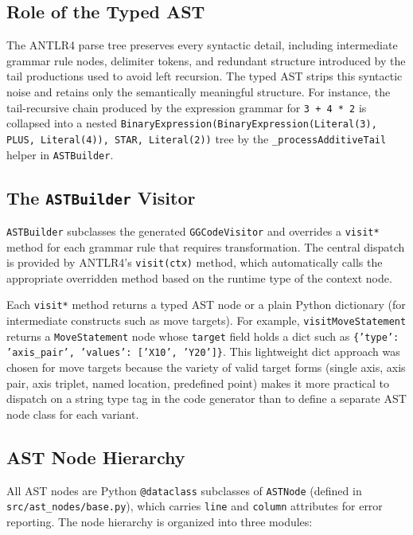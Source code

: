 \subsection*{Role of the Typed AST}

The ANTLR4 parse tree preserves every syntactic detail, including intermediate grammar rule nodes, delimiter tokens, and redundant structure introduced by the tail productions used to avoid left recursion. The typed AST strips this syntactic noise and retains only the semantically meaningful structure. For instance, the tail-recursive chain produced by the expression grammar for \texttt{3 + 4 * 2} is collapsed into a nested \texttt{BinaryExpression(BinaryExpression(Literal(3), PLUS, Literal(4)), STAR, Literal(2))} tree by the \texttt{\_processAdditiveTail} helper in \texttt{ASTBuilder}.

\subsection*{The \texttt{ASTBuilder} Visitor}

\texttt{ASTBuilder} subclasses the generated \texttt{GGCodeVisitor} and overrides a \texttt{visit*} method for each grammar rule that requires transformation. The central dispatch is provided by ANTLR4's \texttt{visit(ctx)} method, which automatically calls the appropriate overridden method based on the runtime type of the context node.

Each \texttt{visit*} method returns a typed AST node or a plain Python dictionary (for intermediate constructs such as move targets). For example, \texttt{visitMoveStatement} returns a \texttt{MoveStatement} node whose \texttt{target} field holds a dict such as \texttt{\{'type': 'axis\_pair', 'values': ['X10', 'Y20']\}}. This lightweight dict approach was chosen for move targets because the variety of valid target forms (single axis, axis pair, axis triplet, named location, predefined point) makes it more practical to dispatch on a string type tag in the code generator than to define a separate AST node class for each variant.

\subsection*{AST Node Hierarchy}

All AST nodes are Python \texttt{@dataclass} subclasses of \texttt{ASTNode} (defined in \texttt{src/ast\_nodes/base.py}), which carries \texttt{line} and \texttt{column} attributes for error reporting. The node hierarchy is organized into three modules:

